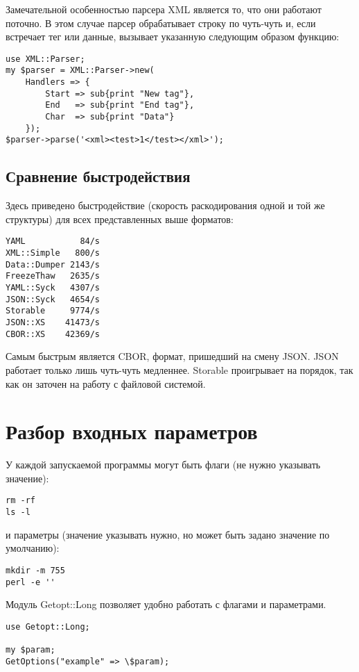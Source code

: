 Замечательной особенностью парсера XML является то, что они работают поточно.
В этом случае парсер обрабатывает строку по чуть-чуть и, если встречает тег или данные, вызывает указанную следующим образом функцию:
\begin{verbatim}
use XML::Parser;
my $parser = XML::Parser->new(
    Handlers => {
        Start => sub{print "New tag"},
        End   => sub{print "End tag"},
        Char  => sub{print "Data"}
    });
$parser->parse('<xml><test>1</test></xml>');
\end{verbatim}

\subsection{Сравнение быстродействия}
Здесь приведено быстродействие (скорость раскодирования одной и той же структуры) для всех представленных выше форматов:
\begin{verbatim}
YAML           84/s
XML::Simple   800/s
Data::Dumper 2143/s
FreezeThaw   2635/s
YAML::Syck   4307/s
JSON::Syck   4654/s
Storable     9774/s
JSON::XS    41473/s
CBOR::XS    42369/s
\end{verbatim}
Самым быстрым является CBOR, формат, пришедший на смену JSON. JSON работает только лишь чуть-чуть медленнее. Storable проигрывает на порядок, так как он заточен на работу с файловой системой.

\section{Разбор входных параметров}
У каждой запускаемой программы могут быть флаги (не нужно указывать значение):
\begin{verbatim}
rm -rf
ls -l
\end{verbatim}
и параметры (значение указывать нужно, но может быть задано значение по умолчанию):
\begin{verbatim}
mkdir -m 755
perl -e ''
\end{verbatim}

Модуль Getopt::Long позволяет удобно работать с флагами и параметрами.
\begin{verbatim}
use Getopt::Long;

my $param;
GetOptions("example" => \$param);
\end{verbatim}

